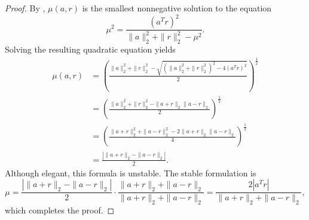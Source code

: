\documentclass[10pt,a4paper]{amsart}
\newcommand{\ts}{^T}
\begin{document}
\begin{proof}
    By , $\mu(a,r)$ is the smallest nonnegative solution to the equation
    \begin{equation*}
        \mu^2 = \frac{(a\ts r)^2}{\|a\|_2^2 + \|r\|_2^2 - \mu^2}.
    \end{equation*}
    Solving the resulting quadratic equation yields 
    \begin{align*}
        \mu(a,r) &= \left(\frac{\|a\|_2^2 + \|r\|_2^2 -\sqrt{(\|a\|_2^2 + \|r\|_2^2)^2 - 4(a\ts r)^2}}{2}\right)^{\frac{1}{2}} \\
        &= \left(\frac{\|a\|_2^2 + \|r\|_2^2 - \|a+r\|_2\|a-r\|_2}{2}\right)^{\frac{1}{2}} \\
        &= \left(\frac{\|a+r\|_2^2 + \|a-r\|_2^2 - 2\|a+r\|_2\|a-r\|_2}{4}\right)^{\frac{1}{2}}\\
        &= \frac{|\|a+r\|_2 - \|a-r\|_2|}{2}.
    \end{align*}
    Although elegant, this formula is unstable. The stable formulation is
    \begin{equation*}
        \mu = \frac{|\|a+r\|_2 - \|a-r\|_2|}{2}\cdot \frac{\|a+r\|_2 + \|a-r\|_2}{\|a+r\|_2+\|a-r\|_2} = \frac{2|a\ts r|}{\|a+r\|_2+\|a-r\|_2},
    \end{equation*}
    which completes the proof.
\end{proof}
\end{document}
